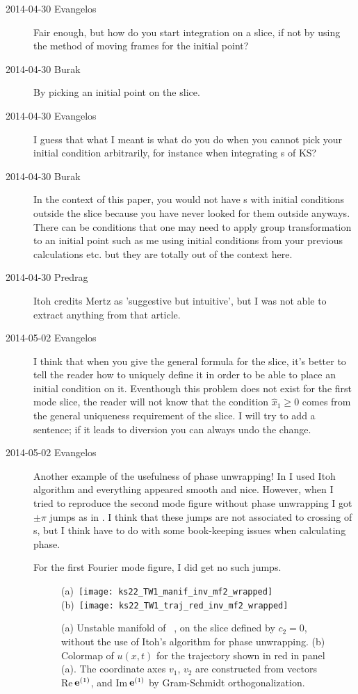 \begin{description}
\item[2014-04-30 Evangelos] Fair enough, but how do you start integration on a slice, if
not by using the method of moving frames for the initial point?

\item[2014-04-30 Burak] By picking an initial point on the slice.

\item[2014-04-30 Evangelos] I guess that what I meant is what do you do
when you cannot pick your initial condition arbitrarily,
for instance when integrating \rpo s of KS?

\item[2014-04-30 Burak] In the context of this paper, you would not have
\rpo s with initial conditions outside the slice because you have never
looked for them outside anyways. There can be conditions that one may need
to apply group transformation to an initial point such as me using initial
conditions from your previous calculations etc. but they are totally out
of the context here.

\item[2014-04-30 Predrag]
Itoh credits Mertz as 'suggestive but intuitive', but I
was not able to extract anything from that article.

\item[2014-05-02 Evangelos] I think that when you give the general formula for the slice,
it's better to tell the reader how to uniquely define it in order to be able to
place an initial condition on it. Eventhough this problem does not exist for the first mode
slice, the reader will not know that the condition $\hat{x}_1\geq0$ comes from the
general uniqueness requirement of the slice. I will try to add a sentence; if it leads to diversion
you can always undo the change.

\item[2014-05-02 Evangelos] Another example of the usefulness of phase unwrapping!
In  I used Itoh algorithm and everything appeared smooth and nice.
However, when I tried to reproduce the second mode figure without phase unwrapping I got $\pm\pi$ jumps as in
. I think that these jumps are not associated to crossing of \sliceBord s,
but I think have to do with some book-keeping issues when calculating phase.

For the first Fourier mode figure, I did get no such jumps.

\begin{figure}
\begin{center}
(a)~\texttt{[image: ks22\_TW1\_manif\_inv\_mf2\_wrapped]}~
(b)~\texttt{[image: ks22\_TW1\_traj\_red\_inv\_mf2\_wrapped]}
\end{center}
\caption{
(a) Unstable manifold of \reqv\ , on the slice defined by $c_2=0$,
without the use of Itoh's algorithm for phase unwrapping. (b)
Colormap of $u(x,t)$ for the trajectory shown in
red in panel (a).
The coordinate axes $v_1$, $v_2$ are constructed from vectors Re\,$\jEigvec[1]$,
and Im\,$\jEigvec[1]$ by Gram-Schmidt
orthogonalization.
       }
\label{f:KS22TW1_manif_mf2_wrapped}
\end{figure}


\end{description}
